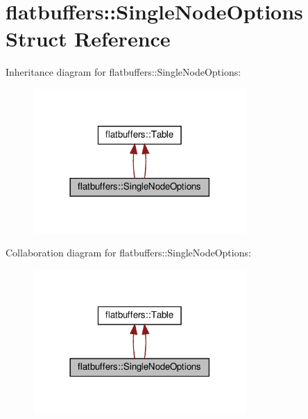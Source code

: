\hypertarget{structflatbuffers_1_1SingleNodeOptions}{}\section{flatbuffers\+:\+:Single\+Node\+Options Struct Reference}
\label{structflatbuffers_1_1SingleNodeOptions}


Inheritance diagram for flatbuffers\+:\+:Single\+Node\+Options\+:
\nopagebreak
\begin{figure}[H]
\begin{center}
\leavevmode
\includegraphics[width=230pt]{structflatbuffers_1_1SingleNodeOptions__inherit__graph}
\end{center}
\end{figure}


Collaboration diagram for flatbuffers\+:\+:Single\+Node\+Options\+:
\nopagebreak
\begin{figure}[H]
\begin{center}
\leavevmode
\includegraphics[width=230pt]{structflatbuffers_1_1SingleNodeOptions__coll__graph}
\end{center}
\end{figure}
